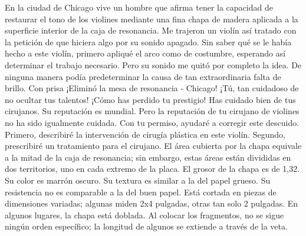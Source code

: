 En la ciudad de Chicago vive un hombre que afirma tener la capacidad de restaurar el tono de los violines mediante una fina chapa de madera aplicada a la superficie interior de la caja de resonancia. Me trajeron un violín así tratado con la petición de que hiciera algo por su sonido apagado. Sin saber qué se le había hecho a este violín, primero apliqué el arco como de costumbre, esperando así determinar el trabajo necesario. Pero su sonido me quitó por completo la idea. De ninguna manera podía predeterminar la causa de tan extraordinaria falta de brillo. Con prisa
¡Eliminó la mesa de resonancia - Chicago!
¡Tú, tan cuidadoso de no ocultar tus talentos! ¡Cómo has perdido tu prestigio! Has cuidado bien de tus cirujanos. Su reputación es mundial. Pero la reputación de tu cirujano de violines no ha sido igualmente cuidada. Con tu permiso, ayudaré a corregir este descuido. Primero, describiré la intervención de cirugía plástica en este violín. Segundo, prescribiré un tratamiento para el cirujano. El área cubierta por la chapa equivale a la mitad de la caja de resonancia; sin embargo, estas áreas están divididas en dos territorios, uno en cada extremo de la placa. El grosor de la chapa es de 1,32. Su color es marrón oscuro. Su textura es similar a la del papel grueso. Su resistencia no es comparable a la del buen papel. Está cortada en piezas de dimensiones variadas; algunas miden 2x4 pulgadas, otras tan solo 2 pulgadas. En algunos lugares, la chapa está doblada. Al colocar los fragmentos, no se sigue ningún orden específico; la longitud de algunos se extiende a través de la veta.

